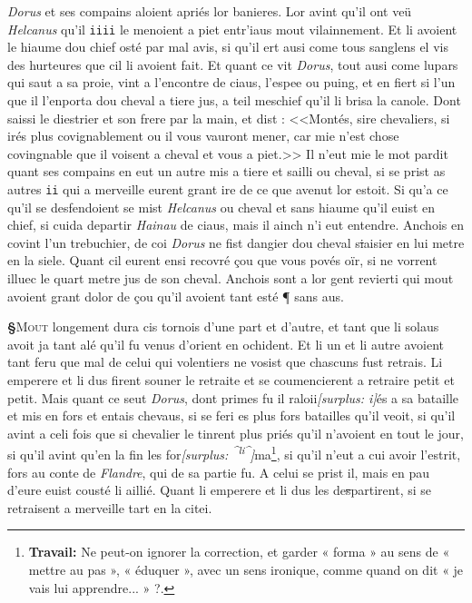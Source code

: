 \documentclass[12pt]{article} %
\newcommand{\persName}[1]{\emph{#1}} %
\newcommand{\placeName}[1]{\emph{#1}} %
\newcommand{\num}[1]{\texttt{#1}}    %
\newcommand{\add}[1]{\textsuperscript{#1}}       %
\newcommand{\fnworknote}[1]{\footnote{\textbf{Travail:} #1}} %
\newcommand{\del}[1]{\sout{#1}}      %
\newcommand{\surplus}[1]{\textit{[surplus: #1]}} %
\newcounter{paranum}
\newcommand{\pnum}{\stepcounter{paranum}\textbf{§\arabic{paranum}}\quad}
\begin{document}
\persName{Dorus} et ses compains aloient apriés lor banieres. Lor avint qu'il ont veü \persName{Helcanus} qu'il \num{iiii} le menoient a piet entr'iaus mout vilainnement. Et li avoient le hiaume dou chief osté par mal avis, si qu'il ert ausi come tous sanglens el vis des hurteures que cil li avoient fait. Et quant ce vit \persName{Dorus}, tout ausi come lupars qui saut a sa proie, vint a l'encontre de ciaus, l'espee ou puing, et en fiert si l'un que il l'enporta dou cheval a tiere jus, a teil meschief qu'il li brisa la canole. Dont saissi le diestrier et son frere par la main, et dist : <<Montés, sire chevaliers, si irés plus covignablement ou il vous vauront mener, car mie n'est chose covingnable que il voisent a cheval et vous a piet.>> Il n'eut mie le mot pardit quant ses compains en eut un autre mis a tiere et sailli ou cheval, si se prist as autres \num{ii} qui a merveille eurent grant ire de ce que avenut lor estoit. Si qu'a ce qu'il se desfendoient se mist \persName{Helcanus} ou cheval et sans hiaume qu'il euist en chief, si cuida departir \persName{Hainau} de ciaus, mais il ainch n'i eut entendre. Anchois en covint l'un trebuchier, de coi \persName{Dorus} ne fist dangier dou cheval s\del{i}aisier en lui metre en la siele. Quant cil eurent ensi recovré çou que vous povés oïr, si ne vorrent illuec le quart metre jus de son cheval. Anchois sont a lor gent revierti qui mout avoient grant dolor de çou qu'il avoient tant esté ¶ sans aus.


\pnum \lettrine[lines=2]{\color{darkred}M}{out} longement dura cis tornois d'une part et d'autre, et tant que li solaus avoit ja tant alé qu'il fu venus d'orient en ochident. Et li un et li autre avoient tant feru que mal de celui qui volentiers ne vosist que chascuns fust retrais. Li emperere et li dus firent souner le retraite et se coumencierent a retraire petit et petit. Mais quant ce seut \persName{Dorus}, dont primes fu il raloii\surplus{i}és a sa bataille et mis en fors et entais chevaus, si se feri es plus fors batailles qu'il veoit, si qu'il avint a celi fois que si chevalier le tinrent plus priés qu'il n'avoient en tout le jour, si qu'il avint qu'en la fin les for\surplus{\add{^li^}}ma\fnworknote{Ne peut-on ignorer la correction, et garder « forma » au sens de « mettre au pas », « éduquer », avec un sens ironique, comme quand on dit « je vais lui apprendre... » ?.}, si qu'il n'eut a cui avoir l'estrit, fors au conte de \placeName{Flandre}, qui de sa partie fu. A celui se prist il, mais en pau d'eure euist cousté li aillié. Quant li emperere et li dus les de\del{s}partirent, si se retraisent a merveille tart en la citei.
\end{document}
